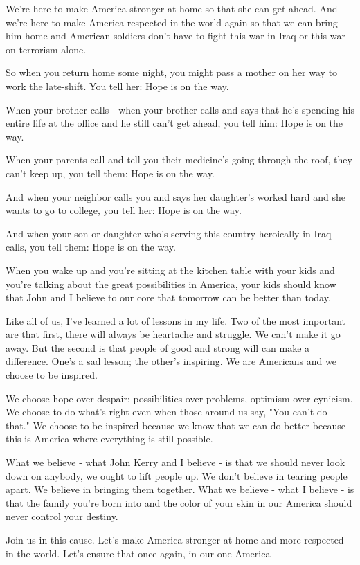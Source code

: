 We're here to make America stronger at home so that she can get ahead.
And we're here to make America respected in the world again so that we
can bring him home and American soldiers don't have to fight this war in
Iraq or this war on terrorism alone.

So when you return home some night, you might pass a mother on her way
to work the late-shift. You tell her: Hope is on the way.

When your brother calls - when your brother calls and says that he's
spending his entire life at the office and he still can't get ahead, you
tell him: Hope is on the way.

When your parents call and tell you their medicine's going through the
roof, they can't keep up, you tell them: Hope is on the way.

And when your neighbor calls you and says her daughter's worked hard and
she wants to go to college, you tell her: Hope is on the way.

And when your son or daughter who's serving this country heroically in
Iraq calls, you tell them: Hope is on the way.

When you wake up and you're sitting at the kitchen table with your kids
and you're talking about the great possibilities in America, your kids
should know that John and I believe to our core that tomorrow can be
better than today.

Like all of us, I've learned a lot of lessons in my life. Two of the
most important are that first, there will always be heartache and
struggle. We can't make it go away. But the second is that people of
good and strong will can make a difference. One's a sad lesson; the
other's inspiring. We are Americans and we choose to be inspired.

We choose hope over despair; possibilities over problems, optimism over
cynicism. We choose to do what's right even when those around us say,
"You can't do that." We choose to be inspired because we know that we
can do better because this is America where everything is still
possible.

What we believe - what John Kerry and I believe - is that we should
never look down on anybody, we ought to lift people up. We don't believe
in tearing people apart. We believe in bringing them together. What we
believe - what I believe - is that the family you're born into and the
color of your skin in our America should never control your destiny.

Join us in this cause. Let's make America stronger at home and more
respected in the world. Let's ensure that once again, in our one America

